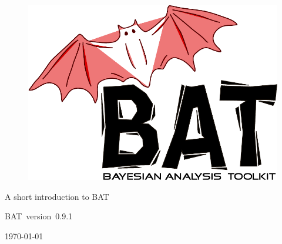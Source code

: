 \documentclass[11pt, a4paper]{article}
\newcommand{\bat}{{\sc BAT}}
\newcommand{\versionno}{0.9.1}
\newcommand{\version}{version~\versionno}
\begin{document}

\thispagestyle{empty}

\begin{figure}
\includegraphics[scale=0.25]{bat}
\end{figure}

\vspace*{1cm}

\begin{center}


{\Large A short introduction to \bat}
\\

\vspace{1cm}

{\large \bat\ \version}

\end{center}

\thispagestyle{empty}

\vfill

\begin{center}
\today
\end{center}

\pagebreak


\thispagestyle{empty}

\enlargethispage{2cm}

\tableofcontents

\pagebreak

\end{document}
